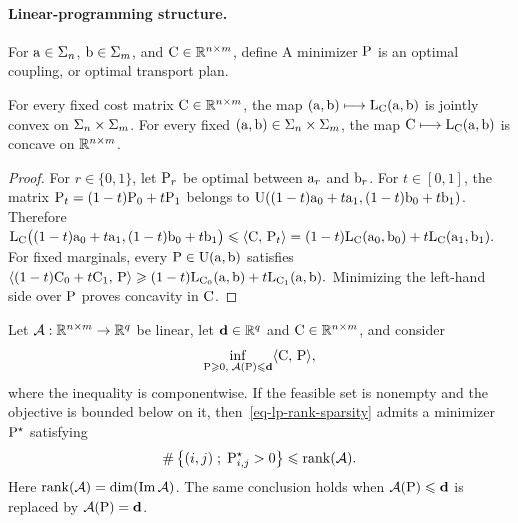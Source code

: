 \paragraph{Linear-programming structure.}
\begin{defn}\label{def-discrete-kantorovich-problem}
For $\a\in\simplex_n$, $\b\in\simplex_m$, and $\C\in\RR^{n\times m}$, define
A minimizer $\P$ is an optimal coupling, or optimal transport plan.
\end{defn}
\begin{prop}\label{prop-discrete-kantorovich-joint-convexity}
For every fixed cost matrix $\C\in\RR^{n\times m}$, the map
\((\a,\b)\longmapsto\MKD_{\C}(\a,\b)\)
is jointly convex on $\simplex_n\times\simplex_m$. For every fixed $(\a,\b)\in\simplex_n\times\simplex_m$, the map
\(\C\longmapsto\MKD_{\C}(\a,\b)\)
is concave on $\RR^{n\times m}$.
\end{prop}
\begin{proof}
For $r\in\{0,1\}$, let $\P_r$ be optimal between $\a_r$ and $\b_r$. For $t\in[0,1]$, the matrix $\P_t=(1-t)\P_0+t\P_1$ belongs to $\CouplingsD((1-t)\a_0+t\a_1,(1-t)\b_0+t\b_1)$. Therefore
\(\MKD_{\C}\big((1-t)\a_0+t\a_1,(1-t)\b_0+t\b_1\big) \leq \dotp{\C}{\P_t} = (1-t)\MKD_{\C}(\a_0,\b_0)+t\MKD_{\C}(\a_1,\b_1).\)
For fixed marginals, every $\P\in\CouplingsD(\a,\b)$ satisfies \(\dotp{(1-t)\C_0+t\C_1}{\P} \geq (1-t)\MKD_{\C_0}(\a,\b) +t\MKD_{\C_1}(\a,\b).\)
Minimizing the left-hand side over $\P$ proves concavity in $\C$.
\end{proof}
\begin{prop}\label{prop-lp-rank-sparsity}
Let $\mathcal A:\RR^{n\times m}\to\RR^q$ be linear, let $\mathbf d\in\RR^q$ and $\C\in\RR^{n\times m}$, and consider
\begin{equation}\label{eq-lp-rank-sparsity}
\inf_{\P\geq 0,\;\mathcal A(\P)\leq\mathbf d}
\dotp{\C}{\P},
\end{equation}
where the inequality is componentwise. If the feasible set is nonempty and the objective is bounded below on it, then~\eqref{eq-lp-rank-sparsity} admits a minimizer $\P^\star$ satisfying
\begin{equation}\label{eq-lp-rank-support-bound}
\#\enscond{(i,j)}{\P^\star_{i,j}>0}
\leq \rank(\mathcal A).
\end{equation}
Here $\rank(\mathcal A)=\dim(\operatorname{Im}\mathcal A)$. The same conclusion holds when $\mathcal A(\P)\leq\mathbf d$ is replaced by $\mathcal A(\P)=\mathbf d$.
\end{prop}
